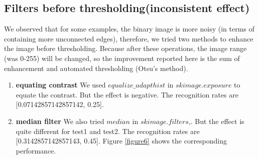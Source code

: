 \documentclass{extarticle}
\theoremstyle{definition}
\theoremstyle{definition}
\begin{document}
\subsection{Filters before thresholding(inconsistent effect)}
We observed that for some examples, the binary image is more noisy (in terms of containing more unconnected edges), therefore, we tried two methods to enhance the image before thresholding. Because after these operations, the image range (was 0-255) will be changed, so the improvement reported here is the sum of enhancement and automated thresholding (Otsu's method). \\
\begin{enumerate}
	\item \textbf{equating contrast} We used \textit{$equalize\_adapthist$} in \textit{$skimage.exposure$} to equate the contrast. But the effect is negative. The recognition rates are [0.07142857142857142, 0.25]. \\
	\item \textbf{median filter} We also tried \textit{$median$} in \textit{$skimage.filters$},. But the effect is quite different for test1 and test2. The recognition rates are [0.3142857142857143, 0.45]. Figure \ref{figure6} shows the corresponding performance.\\
\end{enumerate}
\end{document}
